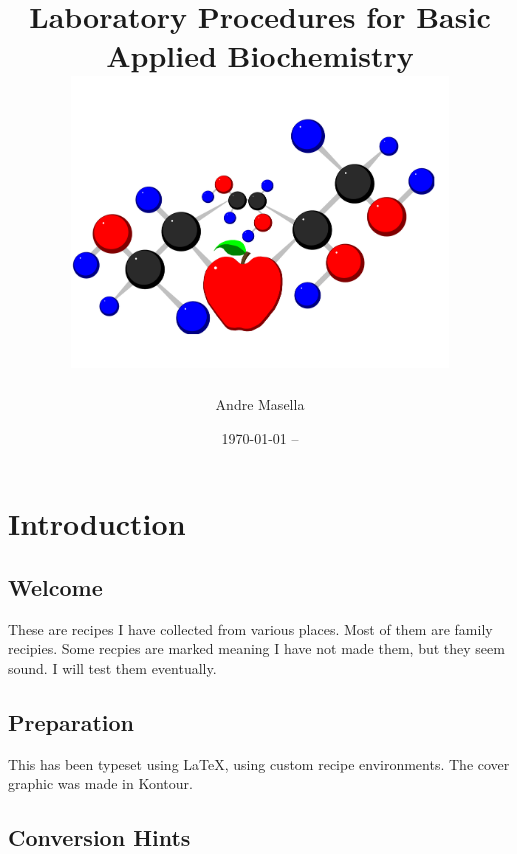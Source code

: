 \documentclass{book}
\begin{document}
\title{Laboratory Procedures for Basic Applied Biochemistry \\
\includegraphics[width=10cm]{CoverLogo} 
}
\author{ Andre Masella }
\date{\today{} -- }
\maketitle

\tableofcontents

\chapter{ Introduction }

\section { Welcome }

These are recipes I have collected from various places. Most of them are
family recipies. Some recpies are marked \UNTESTED meaning I have not
made them, but they seem sound.  I will test them eventually.\par

\section { Preparation }

This has been typeset using \LaTeX{}, using custom recipe environments.
The cover graphic was made in Kontour.\par

\section { Conversion Hints }
\end{document}

